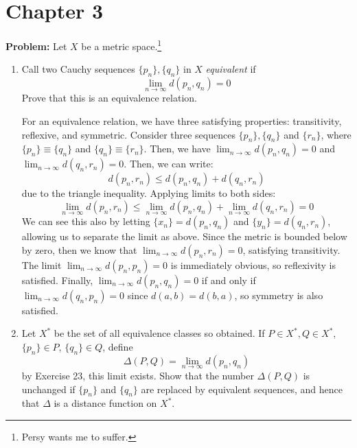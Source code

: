 \documentclass[10pt]{article}
\newenvironment{problem}{\textbf{Problem:}}{}
\begin{document}
	\section{Chapter 3}
	\begin{problem}
		Let \( X \) be a metric space.\footnote{Persy wants me to suffer.}
		\begin{enumerate}[label=\alph*)]
			\item Call two Cauchy sequences \( \{p_n\} ,  \{q_n\} \) in \( X \) \textit{equivalent} if 
				\[
				\lim_{n \to \infty}d(p_n, q_n) = 0
				\] 
				Prove that this is an equivalence relation. 

				\begin{solution}
					For an equivalence relation, we have three satisfying properties: transitivity, reflexive, and 
					symmetric. 
					Consider three sequences \( \{p_n\}, \{q_n\}  \) and \( \{r_n\}  \), where 
					\( \{p_n\} \equiv \{q_n\}  \) and \( \{q_n\}  \equiv \{r_n\}  \). Then, we have 
					\( \lim_{n \to \infty}d(p_n, q_n) = 0 \) and \( \lim_{n \to \infty}d(q_n, r_n) = 0 \). Then, 
					we can write:
					\[
					d(p_n, r_n) \le d(p_n, q_n) + d(q_n, r_n)
					\] 
					due to the triangle inequality. Applying limits to both sides:
					\[
					\lim_{n \to \infty}d(p_n, r_n) \le \lim_{n\to \infty}d(p_n, q_n) + \lim_{n \to \infty}d(q_n, r_n)
					= 0
					\] 
					We can see this also by letting \( \{x_n\} = d(p_n, q_n) \) and \( \{y_n\} = d(q_n, r_n) \), 
					allowing us to separate the limit as above. 
					Since the metric is bounded below by zero, then we know that \( \lim_{n \to \infty}d(p_n, r_n) 
					= 0\), satisfying transitivity. The limit \( \lim_{n \to \infty}d(p_n, p_n) = 0 \) is 
					immediately obvious, so reflexivity is satisfied. Finally, 
					\( \lim_{n \to \infty}d(p_n, q_n) = 0 \) if and only if	\( \lim_{n \to \infty}d(q_n, p_n) = 0 \) 
					since \( d(a, b) = d(b, a) \), so symmetry is also satisfied. 
				\end{solution}
			\item Let \( X^{*} \) be the set of all equivalence classes so obtained. If \( P \in X^{*}, 
				Q \in X^{*}\), \( \{p_n\}  \in P \), \( \{q_n\}  \in Q \), define 
				\[
				\Delta(P, Q) = \lim_{n \to \infty}d(p_n, q_n)
				\] 
				by Exercise 23, this limit exists. Show that the number \( \Delta(P, Q) \) is unchanged if 
				\( \{p_n\}  \) and \( \{q_n\}  \) are replaced by equivalent sequences, and hence that 
				\( \Delta \) is a distance function on \( X^{*} \). 


\end{enumerate}
\end{problem}
\end{document}

